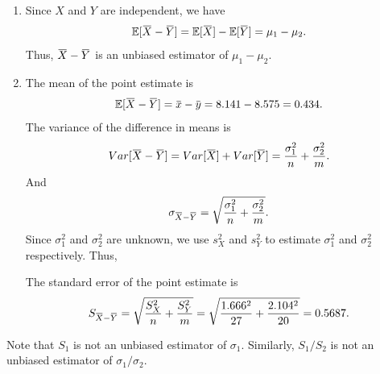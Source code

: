 \begin{solution}
    \begin{enumerate}
        \item Since $X$ and $Y$ are independent, we have
        \[
            \mathbb{E}[\ols{X} - \ols{Y}] = \mathbb{E}[\ols{X}] - \mathbb{E}[\ols{Y}] = \mu_1 - \mu_2.
        \]
        Thus, $\ols{X} - \ols{Y}$ is an unbiased estimator of $\mu_1 - \mu_2$.
        
        \item The mean of the point estimate is 
        \[
            \mathbb{E}[\ols{X} - \ols{Y}] = \ols{x} - \ols{y} = 8.141 - 8.575 = 0.434.
        \]
        The variance of the difference in means is
        \[
            Var[\ols{X} - \ols{Y}] = Var[\ols{X}] + Var[\ols{Y}] = \frac{\sigma^2_1}{n} + \frac{\sigma^2_2}{m}.
        \]
        And 
        \[
            \sigma_{\ols{X} - \ols{Y}} = \sqrt{\frac{\sigma^2_1}{n} + \frac{\sigma^2_2}{m}}.
        \]
        Since $\sigma^2_1$ and $\sigma^2_2$ are unknown, we use $s^2_X$ and $s^2_Y$ to estimate $\sigma^2_1$ and $\sigma^2_2$ respectively. Thus,

        The standard error of the point estimate is
        \[
            S_{\ols{X} - \ols{Y}} = \sqrt{\frac{S^2_X}{n} + \frac{S^2_Y}{m}} = 
            \sqrt{\frac{1.666^2}{27} + \frac{2.104^2}{20}} = 0.5687.
        \]

    \begin{figure}[ht]
    \centering
    \end{figure}

    \end{enumerate}
\end{solution}
\begin{remark}
    Note that $S_1$ is not an unbiased estimator of $\sigma_1$. 
    Similarly, $S_1 / S_2$ is not an unbiased estimator of $\sigma_1 / \sigma_2$.
\end{remark}

